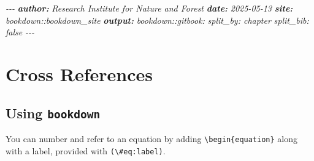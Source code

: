 \documentclass[
  a4paper,
  twoside,
  openright]{book}
\newenvironment{Shaded}{\begin{snugshade}}{\end{snugshade}}
\newcommand{\AnnotationTok}[1]{\textcolor[rgb]{0.56,0.35,0.01}{\textbf{\textit{#1}}}}
\newcommand{\CommentTok}[1]{\textcolor[rgb]{0.56,0.35,0.01}{\textit{#1}}}
\theoremstyle{definition}
\theoremstyle{definition}
\theoremstyle{definition}
\theoremstyle{definition}
\theoremstyle{remark}
\begin{document}
\begin{Shaded}
\begin{Highlighting}[]
\CommentTok{{-}{-}{-}}
\AnnotationTok{author:}\CommentTok{ Research Institute for Nature and Forest}
\AnnotationTok{date:}\CommentTok{ \textquotesingle{}2025{-}05{-}13\textquotesingle{}}
\AnnotationTok{site:}\CommentTok{ bookdown::bookdown\_site}
\AnnotationTok{output:}
\CommentTok{  bookdown::gitbook:}
\CommentTok{    split\_by: chapter}
\CommentTok{    split\_bib: false}
\CommentTok{{-}{-}{-}}
\end{Highlighting}
\end{Shaded}

\section{Cross References}\label{cross-references}

\subsection{\texorpdfstring{Using \texttt{bookdown}}{Using bookdown}}\label{using-bookdown}

You can number and refer to an equation by adding \texttt{\textbackslash{}begin\{equation\}} along with a label, provided with \texttt{(\textbackslash{}\#eq:label)}.
\end{document}
